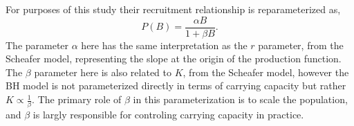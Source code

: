 %
For purposes of this study their recruitment relationship is 
reparameterized as, %
%
\begin{equation}
P(B) = \frac{\alpha B}{1+\beta B}.
\end{equation}
%
The parameter $\alpha$ here has the same interpretation as the $r$ parameter, 
from the Scheafer model, representing the slope at the origin of the 
production function. The $\beta$ parameter here is also related to $K$, 
from the Scheafer model, however the BH model is not parameterized 
directly in terms of carrying capacity but rather $K\propto\frac{1}{\beta}$. 
The primary role of $\beta$ in this parameterization is to scale the 
population, and $\beta$ is largly responsible for controling carrying capacity 
in practice. 

